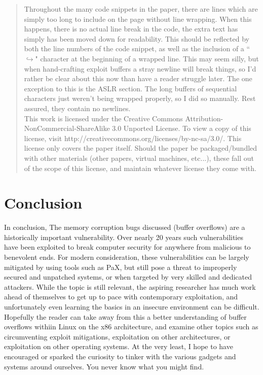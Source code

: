 \documentclass[a4paper]{article}
\begin{document}
\begin{abstract}
Throughout the many code snippets in the paper, there are lines which are simply too long
to include on the page without line wrapping. When this happens, there is no actual line break
in the code, the extra text has simply has been moved down for readability. This should
be reflected by both the line numbers of the code snippet, as well as the inclusion
of a ``$\hookrightarrow$" character at the beginning of a wrapped line. This may seem silly,
but when hand-crafting exploit buffers a stray newline will break things, so I'd rather
be clear about this now than have a reader struggle later. The one exception to this is the
ASLR section. The long buffers of sequential characters just weren't being wrapped properly,
so I did so manually. Rest assured, they contain no newlines.\\

This work is licensed under the Creative Commons Attribution-NonCommercial-ShareAlike 3.0 Unported License.
To view a copy of this license, visit http://creativecommons.org/licenses/by-nc-sa/3.0/. This
license only covers the paper itself. Should the paper be packaged/bundled with other
materials (other papers, virtual machines, etc...), these fall out of the scope of this license,
and maintain whatever license they come with.

\end{abstract}





\section{Conclusion}
In conclusion, The memory corruption bugs discussed (buffer overflows)
are a historically important vulnerability. Over nearly 20 years such
vulnerabilities have been exploited to break computer security for anywhere
from malicious to benevolent ends. For modern consideration, these vulnerabilities
can be largely mitigated by using tools such as PaX, but still pose a threat
to improperly secured and unpatched systems, or when targeted by very
skilled and dedicated attackers. While the topic is still relevant, the
aspiring researcher has much work ahead of themselves to get up to pace
with contemporary exploitation, and unfortunately even learning the basics
in an insecure environment can be difficult.
Hopefully the reader can take away from this a better understanding of buffer
overflows withiin Linux on the x86 architecture, and examine other topics
such as circumventing exploit mitigations, exploitation on other architectures,
or exploitation on other operating systems. At the very least, I hope to have
encouraged or sparked the curiosity to tinker with the various gadgets and systems
around ourselves. You never know what you might find.
\end{document}
